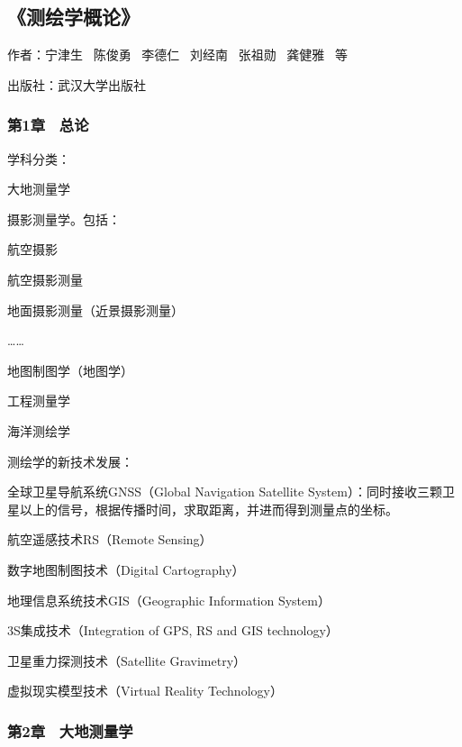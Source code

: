 \subsection{《测绘学概论》}

作者：宁津生 \ 陈俊勇 \ 李德仁  \ 刘经南 \ 张祖勋 \ 龚健雅 \ 等

出版社：武汉大学出版社

\subsubsection{第1章 \ 总论}



学科分类：
\begin{itemize*}
    \item 大地测量学
    \item 摄影测量学。包括：
    \begin{itemize*}
        \item 航空摄影
        \item 航空摄影测量
        \item 地面摄影测量（近景摄影测量）
        \item ……
    \end{itemize*}
    \item 地图制图学（地图学）
    \item 工程测量学
    \item 海洋测绘学
\end{itemize*}


测绘学的新技术发展：
\begin{itemize*}
    \item 全球卫星导航系统GNSS（Global Navigation Satellite System）：同时接收三颗卫星以上的信号，根据传播时间，求取距离，并进而得到测量点的坐标。
    \item 航空遥感技术RS（Remote Sensing）
    \item 数字地图制图技术（Digital Cartography）
    \item 地理信息系统技术GIS（Geographic Information System）
    \item 3S集成技术（Integration of GPS, RS and GIS technology）
    \item 卫星重力探测技术（Satellite Gravimetry）
    \item 虚拟现实模型技术（Virtual Reality Technology）
\end{itemize*}


\subsubsection{第2章 \ 大地测量学}

